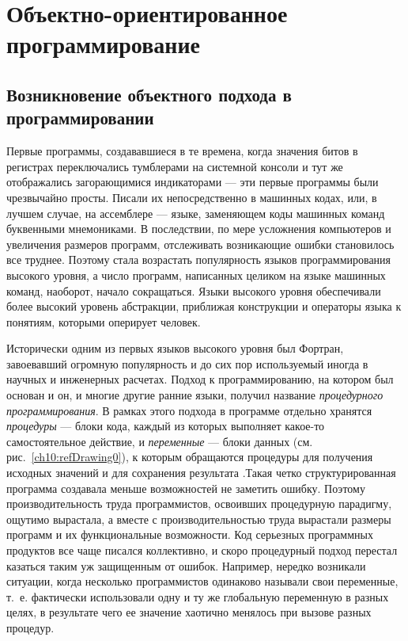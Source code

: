 \renewcommand{\arraystretch}{0.5}
\chapter{Объектно-ориентированное программирование}%
\section{Возникновение объектного подхода в программировании}
Первые программы, создававшиеся в те времена, когда значения битов в регистрах переключались тумблерами на системной
консоли и тут же отображались загорающимися индикаторами --- эти первые программы были чрезвычайно просты. Писали их
непосредственно в машинных кодах, или, в лучшем случае, на ассемблере --- языке, заменяющем коды машинных команд
буквенными мнемониками. В последствии, по мере усложнения компьютеров и увеличения размеров программ, отслеживать
возникающие ошибки становилось все труднее. Поэтому стала возрастать популярность языков программирования высокого
уровня, а число программ, написанных целиком на языке машинных команд, наоборот, начало сокращаться. Языки высокого
уровня обеспечивали более высокий уровень абстракции, приближая конструкции и операторы языка к понятиям, которыми
оперирует человек.

Исторически одним из первых языков высокого уровня был Фортран, завоевавший огромную популярность и до сих пор
используемый иногда в научных и инженерных расчетах. Подход к программированию, на котором был основан и он, и многие
другие ранние языки, получил название \emph{процедурного программирования}. В рамках этого подхода в
программе отдельно хранятся \emph{процедуры} --- блоки кода, каждый из которых выполняет какое-то
самостоятельное действие, и \emph{переменные} --- блоки данных (см. рис.~\ref{ch10:refDrawing0}), к которым
обращаются процедуры для получения исходных значений и для сохранения результата .Такая четко структурированная
программа создавала меньше возможностей не заметить ошибку. Поэтому производительность труда программистов, освоивших
процедурную парадигму, ощутимо вырастала, а вместе с производительностью труда вырастали размеры программ и их
функциональные возможности. Код серьезных программных продуктов все чаще писался коллективно, и скоро процедурный
подход перестал казаться таким уж защищенным от ошибок. Например, нередко возникали ситуации, когда несколько
программистов одинаково называли свои переменные, т.~е. фактически использовали одну и ту же глобальную переменную в
разных целях, в результате чего ее значение хаотично менялось при вызове разных процедур. 

